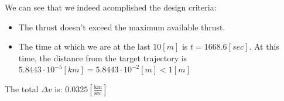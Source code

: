 \documentclass[11pt, a4paper]{article}
\begin{document}
We can see that we indeed acomplished the design criteria:
\begin{itemize}
    \item The thrust doesn't exceed the maximum available thrust.
    \item The time at which we are at the last $10[m]$ is $t=1668.6[sec]$. At this time, the distance from the target trajectory is $5.8443\cdot10^{-5}[km]=5.8443\cdot10^{-2}[m]<1[m]$ 
    
\end{itemize}

The total $\Delta v$ is: $0.0325\left[\displaystyle\frac{\mathrm{km}}{\mathrm{sec}}\right]$
\end{document}
